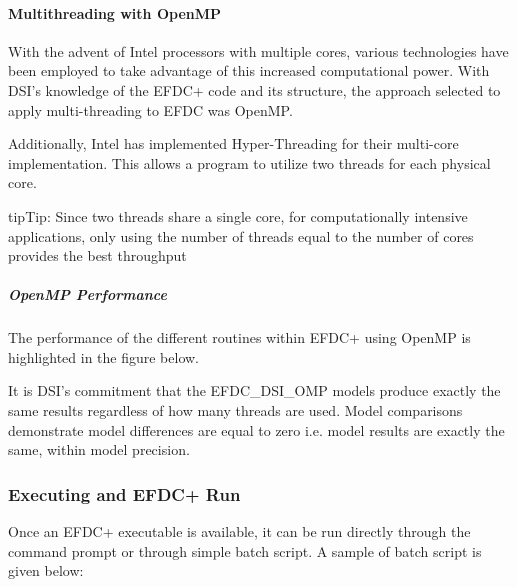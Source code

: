 \documentclass[letterpaper,10pt,english]{sphinxmanual}
\begin{document}
\paragraph{Multithreading with OpenMP}
\label{\detokenize{started/running:multithreading-with-openmp}}
With the advent of Intel processors with multiple cores, various technologies have been employed to take advantage of this increased computational power.  With DSI’s knowledge of the EFDC+ code and its structure, the approach selected to apply multi-threading to EFDC was OpenMP.

Additionally, Intel has implemented Hyper-Threading for their multi-core implementation.  This allows a program to utilize two threads for each physical core.

\begin{sphinxadmonition}{tip}{Tip:}
Since two threads share a single core, for computationally intensive applications, only using the number of threads equal to the number of cores provides the best throughput
\end{sphinxadmonition}


\subparagraph{OpenMP Performance}
\label{\detokenize{started/running:openmp-performance}}
The performance of the different routines within EFDC+ using OpenMP is highlighted in the figure below.


It is DSI’s commitment that the EFDC\_DSI\_OMP models produce exactly the same results regardless of how many threads are used.  Model comparisons demonstrate model differences are equal to zero  i.e. model results are exactly the same, within model precision.


\subsubsection{Executing and EFDC+ Run}
\label{\detokenize{started/running:executing-and-efdc-run}}
Once an EFDC+ executable is available, it can be run directly through the command prompt or through simple batch script.  A sample of batch script is given below:

\begin{sphinxVerbatim}[commandchars=\\\{\}]
 

     

 

  

\end{sphinxVerbatim}
\end{document}
